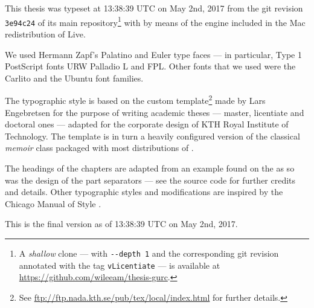 

\newcommand{\GitTimestamp}{13:38:39 UTC on May 2nd, 2017\xspace}
\newcommand{\GitRevision}{\texttt{3e94c24}\xspace}
This thesis was typeset at \GitTimestamp from the git revision \GitRevision
 of its main repository\footnote{A \emph{shallow} clone --- with \texttt{-{}-depth 
1} and the corresponding git revision annotated with the tag \texttt{vLicentiate} 
--- is available at \url{https://github.com/wileeam/thesis-gurc}.}
with  by means of the  engine  included 
in the Mac redistribution of  Live.

We used Hermann Zapf’s Palatino and Euler type faces --- in particular, Type 1 PostScript 
fonts URW Palladio L and FPL. Other fonts that we used were the Carlito and the 
Ubuntu font families.

The typographic style is based on the custom template\footnote{See \url{ftp://ftp.nada.kth.se/pub/tex/local/index.html} 
for further details.} made by Lars Engebretsen for the purpose of writing academic 
theses --- master, licentiate and doctoral ones --- adapted for the corporate design 
of KTH Royal Institute of Technology. The template is in turn a heavily configured 
version of the classical \emph{memoir} class packaged with most distributions of 
. 

The headings of the chapters are adapted from an example found on the \Internet 
as so was the design of the part separators --- see the source code for further 
credits and details. Other typographic styles and modifications are inspired by 
the Chicago Manual of Style \cite{Chicago10}.

%
%

This is the final version as of \GitTimestamp.
